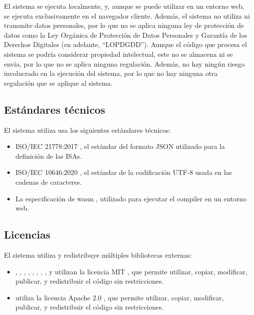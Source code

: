 El sistema se ejecuta localmente, y, aunque se puede utilizar en un entorno web,
se ejecuta exclusivamente en el navegador cliente. Además, el sistema no utiliza
ni transmite datos personales, por lo que no se aplica ninguna ley de protección
de datos como la Ley Orgánica de Protección de Datos Personales y Garantía de
los Derechos Digitales (en adelante, ``LOPDGDD''). Aunque el código
 que procesa el sistema se podría considerar
propiedad intelectual, este no se almacena ni se envía, por lo que no se aplica
ninguna regulación. Además, no hay ningún riesgo involucrado en la ejecución del
sistema, por lo que no hay ninguna otra regulación que se aplique al sistema.

\subsection{Estándares técnicos}\label{subsec:standards}

\noindent
El sistema utiliza usa los siguientes estándares técnicos:

\begin{itemize}
    \item ISO/IEC 21778:2017 \parencite{JSONStandard}, el estándar del formato
    JSON utilizado para la definición de las \glspl{ISA}.
    \item ISO/IEC 10646:2020 \parencite{UTF-8}, el estándar de la codificación
    UTF-8 usada en las cadenas de caracteres.
    \item La especificación de \gls{wasm} \parencite{wasm-spec}, utilizado para
    ejecutar el \gls{compiler} en un entorno web.
\end{itemize}

\subsection{Licencias}\label{subsec:licenses}

El sistema utiliza y redistribuye múltiples bibliotecas externas:

\begin{itemize}
    \item {}, , ,
    , , 
    , , , y
     utilizan la licencia MIT \parencite{MIT}, que permite
    utilizar, copiar, modificar, publicar, y redistribuir el código sin
    restricciones.
    \item {} utiliza la licencia Apache 2.0
    \parencite{apache2}, que permite utilizar, copiar, modificar, publicar, y redistribuir el código sin
    restricciones.
\end{itemize}

